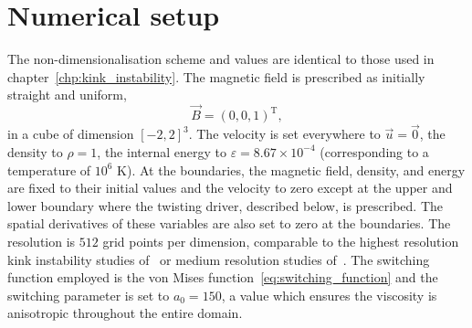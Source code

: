 \section{Numerical setup}

The non-dimensionalisation scheme and values are identical to those used in chapter~\ref{chp:kink_instability}. The magnetic field is prescribed as initially straight and uniform,
\begin{equation}
\vec{B} = (0, 0, 1)^{\text{T}},
\end{equation}
in a cube of dimension $[-2,2]^3$. The velocity is set everywhere to $\vec{u} = \vec{0}$, the density to $\rho = 1$, the internal energy to $\varepsilon = 8.67\times 10^{-4}$ (corresponding to a temperature of $10^6$ K). At the boundaries, the magnetic field, density, and energy are fixed to their initial values and the velocity to zero except at the upper and lower boundary where the twisting driver, described below, is prescribed. The spatial derivatives of these variables are also set to zero at the boundaries. The resolution is $512$ grid points per dimension, comparable to the highest resolution kink instability studies of~\cite{hoodCoronalHeatingMagnetic2009} or medium resolution studies of~\cite{barefordShockHeatingNumerical2015}. The switching function employed is the von Mises function~\eqref{eq:switching_function} and the switching parameter is set to $a_0 = 150$, a value which ensures the viscosity is anisotropic throughout the entire domain. 

